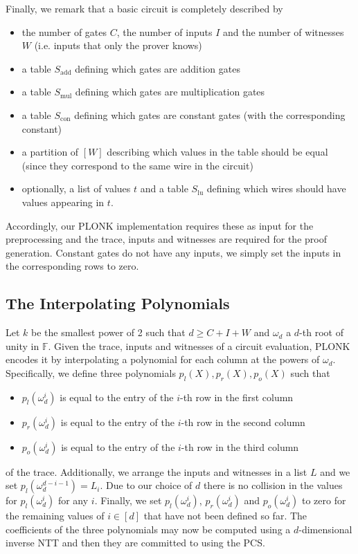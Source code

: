 \documentclass[final]{zamarep}
\newcommand{\field}{\mathbb{F}}
\newcommand{\Sel}[1]{S_{\mathrm{#1}}}
\begin{document}
Finally, we remark that a basic circuit is completely described by
\begin{itemize}
\item the number of gates $C$, the number of inputs $I$ and the number of witnesses $W$ (i.e. inputs that only the prover knows)
\item a table $\Sel{add}$ defining which gates are addition gates
\item a table $\Sel{mul}$ defining which gates are multiplication gates
\item a table $\Sel{con}$ defining which gates are constant gates (with the corresponding constant)
\item a partition of $[W]$ describing which values in the table should be equal (since they correspond to the same wire in the circuit)
\item optionally, a list of values $t$ and a table $\Sel{lu}$ defining which wires should have values appearing in $t$.
\end{itemize}
Accordingly, our PLONK implementation requires these as input for the preprocessing and the trace, inputs and witnesses are required for the proof generation. Constant gates do not have any inputs, we simply set the inputs in the corresponding rows to zero.

\subsection{The Interpolating Polynomials}
\label{sec:poly}
Let $k$ be the smallest power of 2 such that $d \geq C + I + W$ and $\omega_d$ a $d$-th root of unity in $\field$. Given the trace, inputs and witnesses of a circuit evaluation, PLONK encodes it by interpolating a polynomial for each column at the powers of $\omega_d$. Specifically, we define three polynomials $p_l(X), p_r(X), p_o(X)$ such that
\begin{itemize}
\item $p_l(\omega_d^i)$ is equal to the entry of the $i$-th row in the first column
\item $p_r(\omega_d^i)$ is equal to the entry of the $i$-th row in the second column
\item $p_o(\omega_d^i)$ is equal to the entry of the $i$-th row in the third column
\end{itemize}
of the trace. Additionally, we arrange the inputs and witnesses in a list $L$ and we set $p_l(\omega_d^{d-i-1}) = L_i$. Due to our choice of $d$ there is no collision in the values for $p_l(\omega_d^i)$ for any $i$. Finally, we set $p_l(\omega_d^i)$, $p_r(\omega_d^i)$ and $p_o(\omega_d^i)$ to zero for the remaining values of
$i \in [d]$ that have not been defined so far. The coefficients of the three polynomials may now be computed using a $d$-dimensional inverse NTT and then they are committed to using the PCS.
\end{document}
